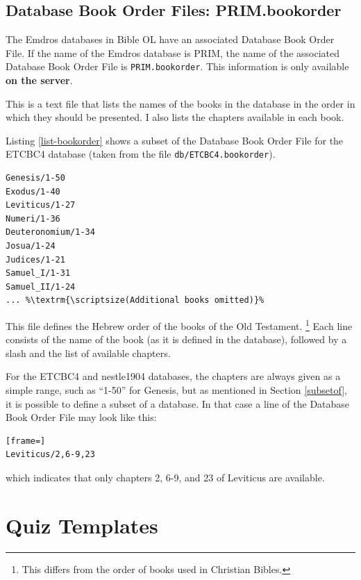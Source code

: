 \documentclass[11pt,oneside,a4paper]{memoir}
\begin{document}
\section{Database Book Order Files: PRIM.bookorder}\label{sec-bookorder}

The Emdros databases in Bible OL have an associated Database Book Order File. If the name of
the Emdros database is PRIM, the name of the associated Database Book Order File is
\texttt{PRIM.bookorder}. This information is only available \textbf{on the server}.

This is a text file that lists the names of the books in the database in the order in which they
should be presented. I also lists the chapters available in each book.

Listing \ref{list-bookorder} shows a subset of the Database Book Order File for the ETCBC4 database
(taken from the file \texttt{db/ETCBC4.bookorder}).

\begin{lstlisting}[caption=A subset of the ETCBC4 Book Order File,label=list-bookorder]
Genesis/1-50
Exodus/1-40
Leviticus/1-27
Numeri/1-36
Deuteronomium/1-34
Josua/1-24
Judices/1-21
Samuel_I/1-31
Samuel_II/1-24
... %\textrm{\scriptsize(Additional books omitted)}%
\end{lstlisting}

This file defines the Hebrew order of the books of the Old Testament.%
%
\footnote{This differs from the order of books used in Christian Bibles.} Each line
consists of the name of the book (as it is defined in the database), followed by a slash and the
list of available chapters.

For the ETCBC4 and nestle1904 databases, the chapters are always given as a simple range, such as
``1-50'' for Genesis, but as mentioned in Section \ref{subsetof}, it is possible to define a
subset of a database. In that case a line of the Database Book Order File may look like this:

\begin{lstlisting}[frame=]
Leviticus/2,6-9,23
\end{lstlisting}

\noindent
which indicates that only chapters 2, 6-9, and 23 of Leviticus are available.


\chapter{Quiz Templates}
\end{document}
